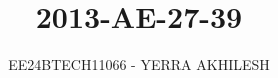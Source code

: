 \documentclass[journal]{IEEEtran}
\begin{document}

\vspace{3cm}

\title{2013-AE-27-39}
\author{EE24BTECH11066 - YERRA AKHILESH
}
{\let\newpage\relax\maketitle}

\renewcommand{\thefigure}{\theenumi}
\renewcommand{\thetable}{\theenumi}
\setlength{\intextsep}{10pt} %


\renewcommand{\thetable}{\theenumi}
\end{document}
